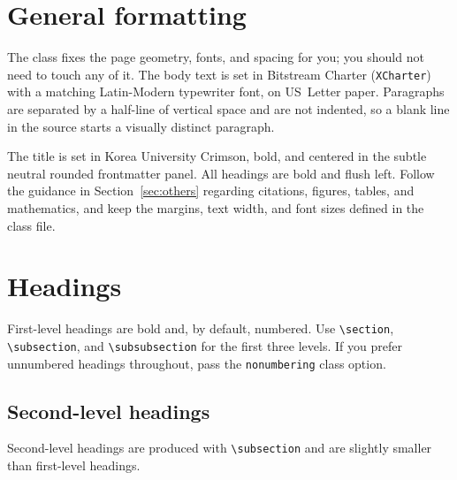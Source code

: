 \section{General formatting}
\label{sec:format}

The class fixes the page geometry, fonts, and spacing for you; you should not
need to touch any of it. The body text is set in Bitstream Charter
(\verb+XCharter+) with a matching Latin-Modern typewriter font, on US~Letter
paper. Paragraphs are separated by a half-line of vertical space and are not
indented, so a blank line in the source starts a visually distinct paragraph.

The title is set in Korea University Crimson, bold, and centered in the subtle neutral rounded frontmatter panel. All headings are bold and flush left. Follow the guidance in Section~\ref{sec:others} regarding citations,
figures, tables, and mathematics, and keep the margins, text width,
and font sizes defined in the class file.




\section{Headings}
\label{sec:headings}

First-level headings are bold and, by default, numbered. Use \verb+\section+,
\verb+\subsection+, and \verb+\subsubsection+ for the first three levels. If you
prefer unnumbered headings throughout, pass the \verb+nonumbering+ class option.

\subsection{Second-level headings}
\label{sec:second}

Second-level headings are produced with \verb+\subsection+ and are slightly
smaller than first-level headings.

